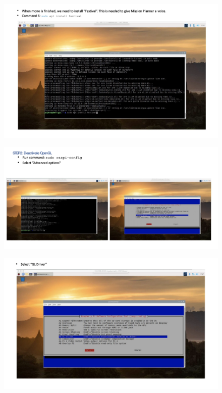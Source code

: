 \begin{figure}[h!]
\centering
\includegraphics[width=\columnwidth]{./Figures/config_img7.png}
\end{figure}

\begin{figure}[h!]
\centering
\includegraphics[width=\columnwidth]{./Figures/config_img8.png}
\end{figure}

\begin{figure}[h!]
\centering
\includegraphics[width=\columnwidth]{./Figures/config_img9.png}
\end{figure}

